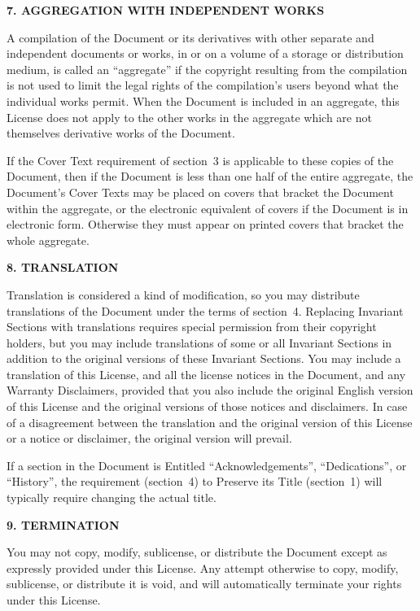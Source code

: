 \documentclass{scrbook}
\begin{document}
\begin{center}
{\Large\bfseries 7. AGGREGATION WITH INDEPENDENT WORKS\par}
\end{center}
A compilation of the Document or its derivatives with other separate
and independent documents or works, in or on a volume of a storage or
distribution medium, is called an ``aggregate'' if the copyright
resulting from the compilation is not used to limit the legal rights
of the compilation's users beyond what the individual works permit.
When the Document is included in an aggregate, this License does not
apply to the other works in the aggregate which are not themselves
derivative works of the Document.

If the Cover Text requirement of section~3 is applicable to these
copies of the Document, then if the Document is less than one half of
the entire aggregate, the Document's Cover Texts may be placed on
covers that bracket the Document within the aggregate, or the
electronic equivalent of covers if the Document is in electronic form.
Otherwise they must appear on printed covers that bracket the whole
aggregate.


\begin{center}
{\Large\bfseries 8. TRANSLATION\par}
\end{center}
Translation is considered a kind of modification, so you may
distribute translations of the Document under the terms of section~4.
Replacing Invariant Sections with translations requires special
permission from their copyright holders, but you may include
translations of some or all Invariant Sections in addition to the
original versions of these Invariant Sections.  You may include a
translation of this License, and all the license notices in the
Document, and any Warranty Disclaimers, provided that you also include
the original English version of this License and the original versions
of those notices and disclaimers.  In case of a disagreement between
the translation and the original version of this License or a notice
or disclaimer, the original version will prevail.

If a section in the Document is Entitled ``Acknowledgements'',
``Dedications'', or ``History'', the requirement (section~4) to Preserve
its Title (section~1) will typically require changing the actual
title.


\begin{center}
{\Large\bfseries 9. TERMINATION\par}
\end{center}
You may not copy, modify, sublicense, or distribute the Document
except as expressly provided under this License.  Any attempt
otherwise to copy, modify, sublicense, or distribute it is void, and
will automatically terminate your rights under this License.
\end{document}
